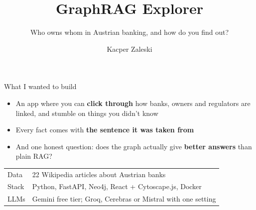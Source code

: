 \documentclass[aspectratio=169,11pt]{beamer}
\title{GraphRAG Explorer}
\subtitle{Who owns whom in Austrian banking, and how do you find out?}
\author{Kacper Zaleski}
\date{}
\newcommand{\hl}[1]{\textcolor{midblue}{\textbf{#1}}}
\begin{document}
\begin{frame}
  \titlepage
\end{frame}

\begin{frame}{What I wanted to build}
  \begin{itemize}
    \item An app where you can \hl{click through} how banks, owners and regulators are linked,
          and stumble on things you didn't know
    \item Every fact comes with \hl{the sentence it was taken from}
    \item And one honest question: does the graph actually give \hl{better answers} than plain RAG?
  \end{itemize}
  \vspace{8pt}
  \small
  \begin{tabular}{ll}
    Data & 22 Wikipedia articles about Austrian banks \\
    Stack & Python, FastAPI, Neo4j, React + Cytoscape.js, Docker \\
    LLMs & Gemini free tier; Groq, Cerebras or Mistral with one setting \\
  \end{tabular}
\end{frame}
\end{document}
